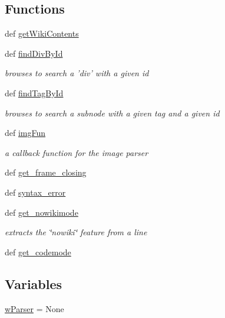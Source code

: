 \subsection*{\-Functions}
\begin{DoxyCompactItemize}
\item 
def \hyperlink{namespaceuicilibris_1_1wikiParser_a3ddb4d65f8af68c58dc5750f4dccc728}{get\-Wiki\-Contents}
\item 
def \hyperlink{namespaceuicilibris_1_1wikiParser_a4d193bab1930cf30a479b771a18ff7f4}{find\-Div\-By\-Id}
\begin{DoxyCompactList}\small\item\em browses to search a 'div' with a given id \end{DoxyCompactList}\item 
def \hyperlink{namespaceuicilibris_1_1wikiParser_aa9b20f02d21d396f8a4f721c3f0adc12}{find\-Tag\-By\-Id}
\begin{DoxyCompactList}\small\item\em browses to search a subnode with a given tag and a given id \end{DoxyCompactList}\item 
def \hyperlink{namespaceuicilibris_1_1wikiParser_abf8e9d35bfb98c9ab89be19af07cfb7a}{img\-Fun}
\begin{DoxyCompactList}\small\item\em a callback function for the image parser \end{DoxyCompactList}\item 
def \hyperlink{namespaceuicilibris_1_1wikiParser_a21e13654addbd3af8e568084e633f1e2}{get\-\_\-frame\-\_\-closing}
\item 
def \hyperlink{namespaceuicilibris_1_1wikiParser_a7e3ef6ec1bc3defb06cbcddbbe16c766}{syntax\-\_\-error}
\item 
def \hyperlink{namespaceuicilibris_1_1wikiParser_adee7ae33686c63070307239a2512b689}{get\-\_\-nowikimode}
\begin{DoxyCompactList}\small\item\em extracts the \char`\"{}nowiki\char`\"{} feature from a line \end{DoxyCompactList}\item 
def \hyperlink{namespaceuicilibris_1_1wikiParser_aaa1b28a5da6c553fd774dcccc3bfc679}{get\-\_\-codemode}
\end{DoxyCompactItemize}
\subsection*{\-Variables}
\begin{DoxyCompactItemize}
\item 
\hyperlink{namespaceuicilibris_1_1wikiParser_aab08ad37f3f58300726ef29403cd6a22}{w\-Parser} = \-None
\end{DoxyCompactItemize}


